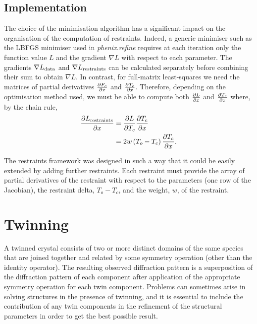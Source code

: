 \documentclass[pdf]{iucr}
\begin{document}
\subsection{Implementation}

The choice of the minimisation algorithm has a significant impact on the organisation of the computation of restraints. Indeed, a generic minimiser such as the LBFGS minimiser used in \emph{phenix.refine} \cite{Afonine:2012aa} requires at each iteration only the function value $L$ and the  gradient $\nabla L$ with respect to each parameter. The gradients $\nabla L_{\text{data}}$ and $\nabla L_{\text{restraints}}$ can be calculated separately before combining their sum to obtain $\nabla L$. In contrast, for full-matrix least-squares we need the matrices of partial derivatives $\frac{\partial F_c}{\partial x}$ and $\frac{\partial T_c}{\partial x}$. Therefore, depending on the optimisation method used, we must be able to compute both $\frac{\partial L}{\partial x}$ and $\frac{\partial T_c}{\partial x}$ where, by the chain rule,
\begin{align}
\frac{\partial L_{\text{restraints}}}{\partial x} &= \frac{\partial L}{\partial T_c} \frac{\partial T_c}{\partial x} \nonumber\\
                             &= 2 w \left(T_o - T_c \right) \frac{\partial T_c}{\partial x}.
\end{align}

The restraints framework was designed in such a way that it could be easily extended by adding further restraints. Each restraint must provide the array of partial derivatives of the restraint with respect to the parameters (one row of the Jacobian), the restraint delta, $T_o - T_c$, and the weight, $w$, of the restraint.


\section{Twinning}
\label{sec:ls_twinning}

A twinned crystal consists of two or more distinct domains of the same species that are joined together and related by some symmetry operation (other than the identity operator). The resulting observed diffraction pattern is a superposition of the diffraction pattern of each component after application of the appropriate symmetry operation for each twin component. Problems can sometimes arise in solving structures in the presence of twinning, and it is essential to include the contribution of any twin components in the refinement of the structural parameters in order to get the best possible result.
\end{document}
